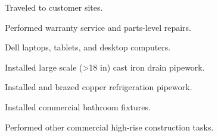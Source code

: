 \begin{tightemize}
    \item Traveled to customer sites.
    \item Performed warranty service and parts-level repairs.
    \item Dell laptops, tablets, and desktop computers.
\end{tightemize}
\subsectionsep

\begin{tightemize}
  \item Installed large scale (>18 in) cast iron drain pipework.
  \item Installed and brazed copper refrigeration pipework.
  \item Installed commercial bathroom fixtures.
  \item Performed other commercial high-rise construction tasks.
\end{tightemize}
\subsectionsep
